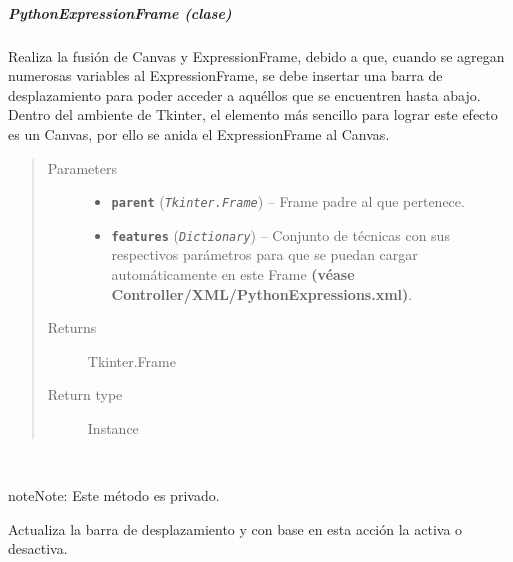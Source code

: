 \documentclass[class=report, crop=false]{standalone}
\begin{document}
\subparagraph{PythonExpressionFrame (clase)}
\label{sec:a_3_3_2_3_3}
\begin{fulllineitems}

\begin{DUlineblock}{0em}
\item[] Realiza la fusión de Canvas y ExpressionFrame, debido a 
que, cuando se agregan numerosas variables al ExpressionFrame, 
se debe insertar una barra de desplazamiento para poder acceder 
a aquéllos que se encuentren hasta abajo.\break
Dentro del ambiente de Tkinter, el elemento más sencillo para 
lograr este efecto es un Canvas, por ello se anida el ExpressionFrame 
al Canvas.
\end{DUlineblock}

\begin{quote}\begin{description}
\item[{Parameters}] \leavevmode\begin{itemize}
\item \textbf{\texttt{parent}} (\emph{\texttt{Tkinter.Frame}}) -- Frame padre al que pertenece.
\item \textbf{\texttt{features}} (\emph{\texttt{Dictionary}}) -- Conjunto de técnicas con sus respectivos parámetros para que se puedan cargar automáticamente en este Frame \textbf{(véase Controller/XML/}\break\textbf{PythonExpressions.xml)}.
\end{itemize}

\item[{Returns}] \leavevmode
Tkinter.Frame
\item[{Return type}] \leavevmode
Instance
\end{description}\end{quote}


\begin{fulllineitems}

~

\begin{notice}{note}{Note:}
Este método es privado.
\end{notice}

Actualiza la barra de desplazamiento y con base en esta 
acción la activa o desactiva.


\end{fulllineitems}
\end{fulllineitems}
\end{document}

